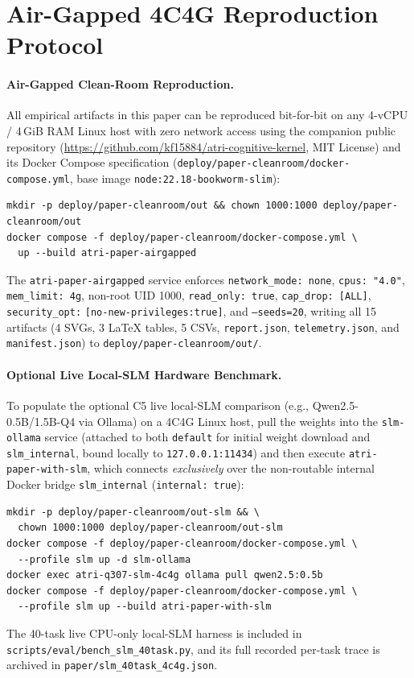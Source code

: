 \section{Air-Gapped 4C4G Reproduction Protocol}
\label{app:repro}

\paragraph{Air-Gapped Clean-Room Reproduction.}
All empirical artifacts in this paper can be reproduced bit-for-bit on any 4-vCPU / 4\,GiB RAM Linux host with zero network access using the companion public repository (\url{https://github.com/kf15884/atri-cognitive-kernel}, MIT License) and its Docker Compose specification (\texttt{deploy/paper-cleanroom/docker-compose.yml}, base image \texttt{node:22.18-bookworm-slim}):
\begin{verbatim}
mkdir -p deploy/paper-cleanroom/out && chown 1000:1000 deploy/paper-cleanroom/out
docker compose -f deploy/paper-cleanroom/docker-compose.yml \
  up --build atri-paper-airgapped
\end{verbatim}
The \texttt{atri-paper-airgapped} service enforces \texttt{network\_mode: none}, \texttt{cpus: "4.0"}, \texttt{mem\_limit: 4g}, non-root UID 1000, \texttt{read\_only: true}, \texttt{cap\_drop: [ALL]}, \texttt{security\_opt:} \texttt{[no-\allowbreak new-\allowbreak privileges:true]}, and \texttt{--seeds=20}, writing all 15 artifacts (4 SVGs, 3 LaTeX tables, 5 CSVs, \texttt{report.json}, \texttt{telemetry.json}, and \texttt{manifest.json}) to \texttt{deploy/\allowbreak paper-cleanroom/\allowbreak out/}.

\paragraph{Optional Live Local-SLM Hardware Benchmark.}
To populate the optional C5 live local-SLM comparison (e.g., Qwen2.5-0.5B/1.5B-Q4 via Ollama) on a 4C4G Linux host, pull the weights into the \texttt{slm-ollama} service (attached to both \texttt{default} for initial weight download and \texttt{slm\_internal}, bound locally to \texttt{127.0.0.1:11434}) and then execute \texttt{atri-paper-with-slm}, which connects \emph{exclusively} over the non-routable internal Docker bridge \texttt{slm\_internal} (\texttt{internal: true}):
\begin{verbatim}
mkdir -p deploy/paper-cleanroom/out-slm && \
  chown 1000:1000 deploy/paper-cleanroom/out-slm
docker compose -f deploy/paper-cleanroom/docker-compose.yml \
  --profile slm up -d slm-ollama
docker exec atri-q307-slm-4c4g ollama pull qwen2.5:0.5b
docker compose -f deploy/paper-cleanroom/docker-compose.yml \
  --profile slm up --build atri-paper-with-slm
\end{verbatim}
The 40-task live CPU-only local-SLM harness is included in \texttt{scripts/eval/bench\_slm\_40task.py}, and its full recorded per-task trace is archived in \texttt{paper/slm\_40task\_4c4g.json}.

